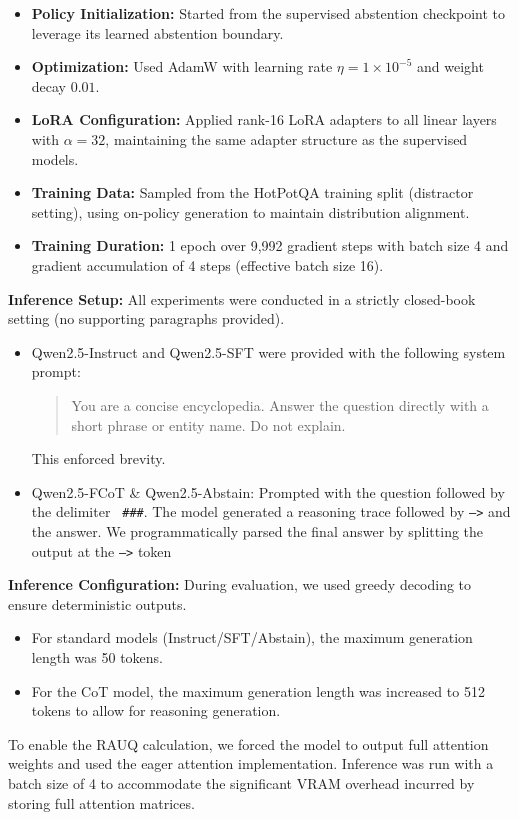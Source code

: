 \documentclass{article}
\begin{document}
\begin{itemize}
    \begin{itemize}
        \item \textbf{Policy Initialization:} Started from the supervised abstention checkpoint to leverage its learned abstention boundary.
        \item \textbf{Optimization:} Used AdamW with learning rate $\eta = 1\times10^{-5}$ and weight decay $0.01$.
        \item \textbf{LoRA Configuration:} Applied rank-16 LoRA adapters to all linear layers with $\alpha=32$, maintaining the same adapter structure as the supervised models.
        \item \textbf{Training Data:} Sampled from the HotPotQA training split (distractor setting), using on-policy generation to maintain distribution alignment.
        \item \textbf{Training Duration:} 1 epoch over 9,992 gradient steps with batch size 4 and gradient accumulation of 4 steps (effective batch size 16).
    \end{itemize}
    

        

\end{itemize}

\textbf{Inference Setup: } All experiments were conducted in a strictly closed-book setting (no supporting paragraphs provided). 
\begin{itemize}
    \item Qwen2.5-Instruct and Qwen2.5-SFT were provided with the following system prompt:
        \begin{quote}
            You are a concise encyclopedia. Answer the question directly with a short phrase or entity name. Do not explain.
        \end{quote}
    This enforced brevity.
    
    \item Qwen2.5-FCoT \& Qwen2.5-Abstain: Prompted with the question followed by the delimiter \texttt{ \#\#\#}. The model generated a reasoning trace followed by \texttt{-->} and the answer. We programmatically parsed the final answer by splitting the output at the \texttt{-->} token
\end{itemize}

\textbf{Inference Configuration:} During evaluation, we used greedy decoding to ensure deterministic outputs. 
\begin{itemize} 
    \item For standard models (Instruct/SFT/Abstain), the maximum generation length was 50 tokens. \item For the CoT model, the maximum generation length was increased to 512 tokens to allow for reasoning generation. 
\end{itemize} 
To enable the RAUQ calculation, we forced the model to output full attention weights and used the eager attention implementation. Inference was run with a batch size of 4 to accommodate the significant VRAM overhead incurred by storing full attention matrices.
\end{document}
